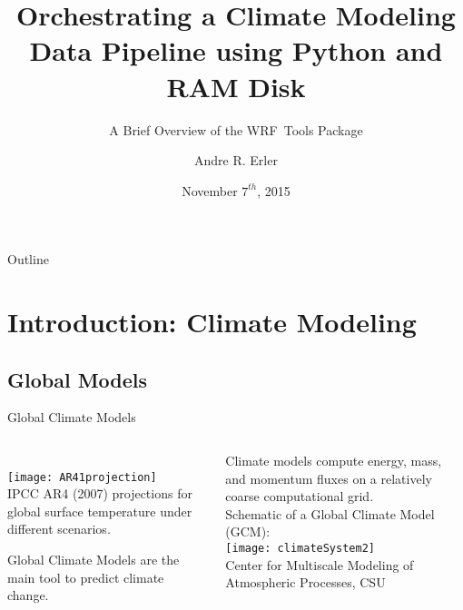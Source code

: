 \documentclass[hyperref={pdfpagelabels=false},compress,final]{beamer}
\title[Orchestrating a Climate Modeling Pipeline]{Orchestrating a Climate Modeling Data Pipeline using Python and RAM Disk}
\subtitle{A Brief Overview of the WRF~Tools Package}
\author[\href{http://www.physics.utoronto.ca/~aerler/}{Andre R. Erler} (\href{mailto:A.R.Erler@gmail.com}{A.R.Erler@gmail.com})]{Andre R. Erler}
\institute{PyCon Canada}
\date{November $7^{th}$, 2015}
\newenvironment{myBox}[3][shadow=true]%
{\begin{center} \begin{minipage}{#2} \begin{beamerboxesrounded}[#1]{#3} \smallskip}%
{\smallskip \end{beamerboxesrounded} \end{minipage} \end{center}}
\begin{document}

\begin{frame}
\titlepage
\end{frame}

\begin{frame}{Outline}
\tableofcontents%
\end{frame}

\section[Introduction]{Introduction: Climate Modeling}




\subsection*{Global Models}

\begin{frame}{\hspace*{0.5\textwidth}Global Climate Models}
 \begin{columns}
   \begin{column}{0.4\textwidth}
     \vspace*{-1cm}\\%
     \texttt{[image: AR41projection]}\\
     {\footnotesize IPCC AR4 (2007) projections for global surface temperature under different scenarios.} \\ \smallskip
   \begin{myBox}[shadow=true]{0.85\textwidth}{}
     \small Global Climate Models are the main tool to predict climate change.
   \end{myBox}
   \end{column}
   \begin{column}{0.7\textwidth}
     {\footnotesize Climate models compute energy, mass, and momentum fluxes on a relatively coarse computational grid. \smallskip \\
     Schematic of a Global Climate Model (GCM):} \smallskip \\
     \texttt{[image: climateSystem2]}\\
     {\tiny Center for Multiscale Modeling of Atmospheric Processes, CSU}
   \end{column}
 \end{columns}
\end{frame}
\end{document}
